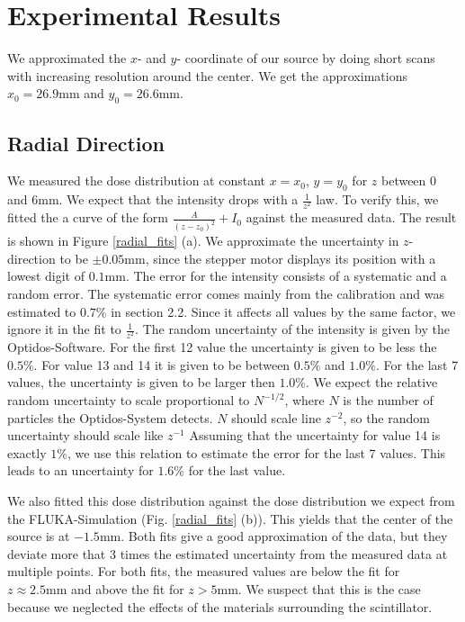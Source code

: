 \documentclass[a4paper,parskip]{scrartcl}
\begin{document}
\section{Experimental Results}

We approximated the $x$- and $y$- coordinate of our source by doing short scans with increasing resolution around the center. We get the approximations $x_0 = 26.9 \mathrm{mm}$ and $y_0 = 26.6 \mathrm{mm}$.

\subsection{Radial Direction}


We measured the dose distribution at constant $x=x_0$, $y=y_0$ for $z$ between 0 and 6mm. We expect that the intensity drops with a $\frac{1}{z^ 2}$ law. To verify this, we fitted the a curve of the form $\frac{A}{(z-z_0)^ 2}+I_0$ against the measured data. The result is shown in Figure \ref{radial_fits} (a). We approximate the uncertainty in $z$-direction to be $\pm 0.05 \mathrm{mm}$, since the stepper motor displays its position with a lowest digit of $0.1\mathrm{mm}$. The error for the intensity consists of a systematic and a random error. The systematic error comes mainly from the calibration and was estimated to $0.7\%$ in section 2.2. Since it affects all values by the same factor, we ignore it in the fit to $\frac{1}{z^2}$. The random uncertainty of the intensity is given by the Optidos-Software. For the first 12 value the uncertainty is given to be less the $0.5\%$. For value 13 and 14 it is given to be between $0.5\%$ and $1.0\%$. For the last 7 values, the uncertainty is given to be larger then $1.0\%$. We expect the relative random uncertainty to scale proportional to $N^ {-1/2}$, where $N$ is the number of particles the Optidos-System detects. $N$ should scale line $z^ {-2}$, so the random uncertainty should scale like $z^ {-1}$ Assuming that the uncertainty for value 14 is exactly $1\%$, we use this relation to estimate the error for the last 7 values. This leads to an uncertainty for $1.6\%$ for the last value.

We also fitted this dose distribution against the dose distribution we expect from the FLUKA-Simulation (Fig. \ref{radial_fits} (b)). This yields that the center of the source is at $-1.5 \mathrm{mm}$. Both fits give a good approximation of the data, but they deviate more that 3 times the estimated uncertainty from the measured data at multiple points. For both fits, the measured values are below the fit for $z \approx 2.5 \mathrm{mm}$ and above the fit for $z > 5 \mathrm{mm}$. We suspect that this is the case because we neglected the effects of the materials surrounding the scintillator. 
\end{document}
